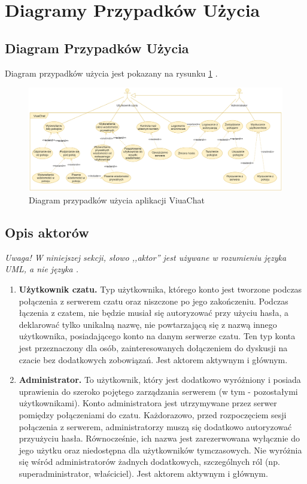 \section{Diagramy Przypadków Użycia}

\subsection{Diagram Przypadków Użycia}

Diagram przypadków użycia jest pokazany na rysunku \ref{dpu-chat-v2}
.
\begin{figure}[!htp]
	\centering
	\includegraphics[width=\textwidth]{chat/fig/dpu-chat-v2}
	\caption{Diagram przypadków użycia aplikacji ViuaChat}
	\label{dpu-chat-v2}
\end{figure}

\subsection{Opis aktorów}

\textit{Uwaga! W niniejszej sekcji, słowo ,,aktor'' jest używane w rozumieniu
języka UML, a nie języka \ViuAct.}

\begin{enumerate}
	\item \textbf{Użytkownik czatu.} Typ użytkownika, którego konto
	jest tworzone podczas połączenia z serwerem czatu oraz niszczone po jego
	zakończeniu. Podczas łączenia z czatem, nie będzie musiał się autoryzować przy
	użyciu hasła, a deklarować tylko unikalną nazwę, nie powtarzającą się z nazwą
	innego użytkownika, posiadającego konto na danym serwerze czatu. Ten typ konta
	jest przeznaczony dla osób, zainteresowanych dołączeniem do dyskusji na czacie
	bez dodatkowych zobowiązań. Jest aktorem aktywnym i głównym.

	\item \textbf{Administrator.} To użytkownik, który jest dodatkowo
	wyróżniony i posiada uprawienia do szeroko pojętego zarządzania serwerem (w
	tym - pozostałymi użytkownikami). Konto administratora jest
	utrzymywane przez serwer pomiędzy połączeniami do czatu. Każdorazowo, przed
	rozpoczęciem sesji połączenia z serwerem, administratorzy muszą się dodatkowo
	autoryzować przyużyciu hasła. Równocześnie, ich nazwa jest zarezerwowana
	wyłącznie do jego	użytku oraz niedostępna	dla użytkowników tymczasowych. Nie
	wyróżnia się wśród administratorów żadnych dodatkowych, szczególnych ról
	(np. superadministrator, właściciel). Jest aktorem aktywnym i głównym.

\end{enumerate}

